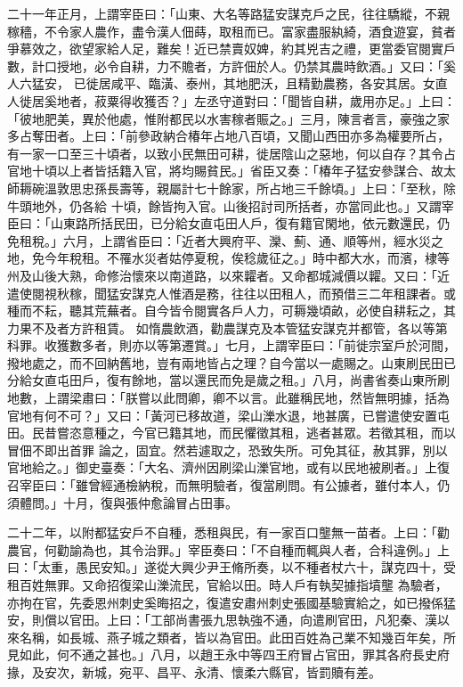 \begin{pinyinscope}
 二十一年正月，上謂宰臣曰：「山東、大名等路猛安謀克戶之民，往往驕縱，不親稼穡，不令家人農作，盡令漢人佃蒔，取租而已。富家盡服紈綺，酒食遊宴，貧者爭慕效之，欲望家給人足，難矣！近已禁賣奴婢，約其兇吉之禮，更當委官閱實戶數，計口授地，必令自耕，力不贍者，方許佃於人。仍禁其農時飲酒。」又曰：「奚人六猛安，
 已徙居咸平、臨潢、泰州，其地肥沃，且精勤農務，各安其居。女直人徙居奚地者，菽粟得收獲否？」左丞守道對曰：「聞皆自耕，歲用亦足。」上曰：「彼地肥美，異於他處，惟附都民以水害稼者賑之。」三月，陳言者言，豪強之家多占奪田者。上曰：「前參政納合椿年占地八百頃，又聞山西田亦多為權要所占，有一家一口至三十頃者，以致小民無田可耕，徙居陰山之惡地，何以自存？其令占官地十頃以上者皆括籍入官，將均賜貧民。」省臣又奏：「椿年子猛安參謀合、故太師耨碗溫敦思忠孫長壽等，親屬計七十餘家，所占地三千餘頃。」上曰：「至秋，除牛頭地外，仍各給
 十頃，餘皆拘入官。山後招討司所括者，亦當同此也。」又謂宰臣曰：「山東路所括民田，已分給女直屯田人戶，復有籍官閑地，依元數還民，仍免租稅。」六月，上謂省臣曰：「近者大興府平、灤、薊、通、順等州，經水災之地，免今年稅租。不罹水災者姑停夏稅，俟稔歲征之。」時中都大水，而濱，棣等州及山後大熟，命修治懷來以南道路，以來糶者。又命都城減價以糶。又曰：「近遣使閱視秋稼，聞猛安謀克人惟酒是務，往往以田租人，而預借三二年租課者。或種而不耘，聽其荒蕪者。自今皆令閱實各戶人力，可耨幾頃畝，必使自耕耘之，其力果不及者方許租賃。
 如惰農飲酒，勸農謀克及本管猛安謀克并都管，各以等第科罪。收獲數多者，則亦以等第遷賞。」七月，上謂宰臣曰：「前徙宗室戶於河間，撥地處之，而不回納舊地，豈有兩地皆占之理？自今當以一處賜之。山東刷民田已分給女直屯田戶，復有餘地，當以還民而免是歲之租。」八月，尚書省奏山東所刷地數，上謂梁肅曰：「朕嘗以此問卿，卿不以言。此雖稱民地，然皆無明據，括為官地有何不可？」又曰：「黃河已移故道，梁山濼水退，地甚廣，已嘗遣使安置屯田。民昔嘗恣意種之，今官已籍其地，而民懼徵其租，逃者甚眾。若徵其租，而以冒佃不即出首罪
 論之，固宜。然若遽取之，恐致失所。可免其征，赦其罪，別以官地給之。」御史臺奏：「大名、濟州因刷梁山濼官地，或有以民地被刷者。」上復召宰臣曰：「雖曾經通檢納稅，而無明驗者，復當刷問。有公據者，雖付本人，仍須體問。」十月，復與張仲愈論冒占田事。



 二十二年，以附都猛安戶不自種，悉租與民，有一家百口壟無一苗者。上曰：「勸農官，何勸諭為也，其令治罪。」宰臣奏曰：「不自種而輒與人者，合科違例。」上曰：「太重，愚民安知。」遂從大興少尹王脩所奏，以不種者杖六十，謀克四十，受租百姓無罪。又命招復梁山濼流民，官給以田。時人戶有執契據指墳壟
 為驗者，亦拘在官，先委恩州刺史奚晦招之，復遣安肅州刺史張國基驗實給之，如已撥係猛安，則償以官田。上曰：「工部尚書張九思執強不通，向遣刷官田，凡犯秦、漢以來名稱，如長城、燕子城之類者，皆以為官田。此田百姓為己業不知幾百年矣，所見如此，何不通之甚也。」八月，以趙王永中等四王府冒占官田，罪其各府長史府掾，及安次，新城，宛平、昌平、永清、懷柔六縣官，皆罰贖有差。




\end{pinyinscope}
